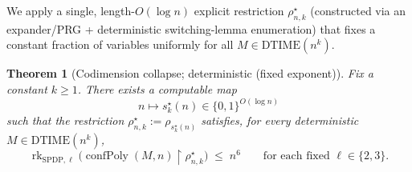 \documentclass[12pt]{article}
\newtheorem{theorem}{Theorem}
\theoremstyle{definition}
\theoremstyle{definition}
\theoremstyle{remark}
\theoremstyle{remark}
\begin{document}
We apply a single, length-$O(\log n)$ explicit restriction $\rho^\star_{n,k}$ (constructed via an expander/PRG + deterministic switching-lemma enumeration) that fixes a constant fraction of variables uniformly for all $M\in\mathrm{DTIME}(n^k)$.

\begin{theorem}[Codimension collapse; deterministic (fixed exponent)]
\label{thm:codim-collapse}
Fix a constant $k\ge 1$. There exists a computable map
\[
n \longmapsto s^\star_k(n)\in\{0,1\}^{O(\log n)}
\]
such that the restriction $\rho^\star_{n,k}:=\rho_{s^\star_k(n)}$ satisfies, for every
deterministic $M\in \mathrm{DTIME}(n^k)$,
\[
\operatorname{rk}_{\mathrm{SPDP},\ell}\!\big(\operatorname{confPoly}(M,n)\!\upharpoonright\!\rho^\star_{n,k}\big)\;\le\;n^{6}\qquad\text{for each fixed }\ell\in\{2,3\}.
\]
\end{theorem}
\end{document}
